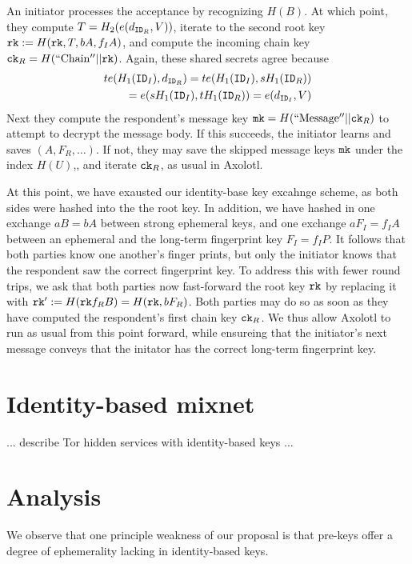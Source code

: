 \documentclass[twoside,letterpaper]{sig-alternate}
\def\mathperiod{.}
\def\mathperiod{}
\begin{document}
An initiator processes the acceptance by recognizing $H(B)$.
At which point, they compute $T = H_2( e(d_{\mathtt{ID}_R}, V) )$,
iterate to the second root key $\mathtt{rk} := H(\mathtt{rk}, T, b A, f_I A )$, and 
compute the incoming chain key $\mathtt{ck}_R = H(\mathrm{``Chain''} || \mathtt{rk})$.
Again, these shared secrets agree because 
\begin{align*}
t e(H_1(\ID_I), d_{\ID_R}) = t e(H_1(\ID_I), s H_1(\ID_R)) \\
 \quad = e(s H_1(\ID_I), t H_1(\ID_R)) = e(d_{\ID_I}, V) \mathperiod
\end{align*}
Next they compute the respondent's
 message key $\mathtt{mk} = H(\mathrm{``Message''}  || \mathtt{ck}_R)$ 
to attempt to decrypt the message body.
If this succeeds, the initiator learns and saves $(A,F_R,\ldots)$.
If not, they may save the skipped message keys $\mathtt{mk}$ under the index $H(U)$,,
and iterate $\mathtt{ck}_R$, as usual in Axolotl.

At this point, we have exausted our identity-base key excahnge scheme,
 as both sides were hashed into the the root key.  In addition, we have
hashed in one exchange $a B = b A$ between strong ephemeral keys, and
one exchange $a F_I = f_I A$ between an ephemeral and
 the long-term fingerprint key $F_I = f_I P$.
It follows that both parties know one another's finger prints, but only
the initiator knows that the respondent saw the correct fingerprint key.
To address this with fewer round trips, we ask that both parties
now fast-forward the root key $\mathtt{rk}$ by replacing it with
 $\mathtt{rk}' := H(\mathtt{rk} f_R B) = H(\mathtt{rk}, b F_R )$.
Both parties may do so as soon as they have computed the respondent's
 first chain key $\mathtt{ck}_R$.
We thus allow Axolotl to run as usual from this point forward, while
ensureing that the initiator's next message conveys that the initator
 has the correct long-term fingerprint key.


\section{Identity-based mixnet} %

... describe Tor hidden services with identity-based keys ...


\section{Analysis}

We observe that one principle weakness of our proposal is that pre-keys
offer a degree of ephemerality lacking in identity-based keys.
\end{document}
